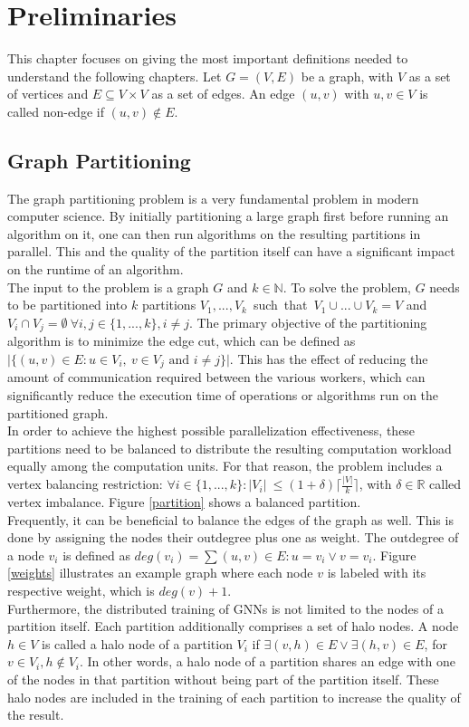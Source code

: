 \documentclass[acmsmall,nonacm,screen,review]{acmart}
\begin{document}
\section{Preliminaries}
This chapter focuses on giving the most important definitions needed to understand the following chapters. Let $G=(V,E)$ be a graph, with $V$ as a set of vertices and $E \subseteq V \times V$ as a set of edges. An edge $(u,v)$ with $u,v \in V$ is called non-edge if $(u,v) \notin E$.
\subsection{Graph Partitioning}
The graph partitioning problem is a very fundamental problem in modern computer science. By initially partitioning a large graph first before running an algorithm on it, one can then run algorithms on the resulting partitions in parallel. This and the quality of the partition itself can have a significant impact on the runtime of an algorithm. \\ 
The input to the problem is a graph $G$ and $k\in \mathbb{N}$. To solve the problem, $G$ needs to be partitioned into $k$ partitions \hbox{$V_{1},...,V_{k}$ such that $V_{1}\cup...\cup V_{k} = V$} and $V_{i}\cap V_{j} = \emptyset\ \forall i,j\in \{1,...,k\}, i \neq j$. The primary objective of the partitioning algorithm is to minimize the edge cut, which can be defined as $\vert \{(u,v)\in E : u\in V_{i},\ v\in V_{j} \text{ and } i\neq j \}\vert$. This has the effect of reducing the amount of communication required between the various workers, which can significantly reduce the execution time of operations or algorithms run on the partitioned graph.  \\
In order to achieve the highest possible parallelization effectiveness, these partitions need to be balanced to distribute the resulting computation workload equally among the computation units. For that reason, the problem includes a vertex balancing restriction: $\forall i\in \{1,...,k\} : \vert V_{i}\vert \ \leq (1 + \delta) \lceil \frac{\vert V \vert }{k} \rceil $, with $\delta \in \mathbb{R}$ called vertex imbalance. Figure \ref{partition} shows a balanced partition. \\
Frequently, it can be beneficial to balance the edges of the graph as well. This is done by assigning the nodes their outdegree plus one as weight. The outdegree of a node $v_{i}$ is defined as $deg(v_{i}) = \sum{(u,v)\in E : u = v_{i} \vee v = v_{i}}$. Figure \ref{weights} illustrates an example graph where each node $v$ is labeled with its respective weight, which is $deg(v) + 1$. \\
Furthermore, the distributed training of GNNs is not limited to the nodes of a partition itself. Each partition additionally comprises a set of halo nodes. A node $h \in V$ is called a halo node of a partition $V_{i}$ if $\exists (v,h) \in E \vee \exists (h,v) \in E$, for $v \in V_{i}, h \notin V_{i}$. In other words, a halo node of a partition shares an edge with one of the nodes in that partition without being part of the partition itself. These halo nodes are included in the training of each partition to increase the quality of the result. 
\end{document}
